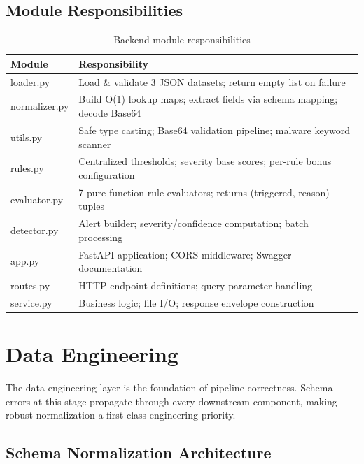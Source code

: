 \documentclass[12pt,a4paper]{article}
\begin{document}
\subsection{Module Responsibilities}

\begin{table}[H]
\centering
\begin{tabularx}{\linewidth}{>{\ttfamily}l X}
\toprule
Module & Responsibility \\
\midrule
loader.py & Load \& validate 3 JSON datasets; return empty list on failure \\
normalizer.py & Build O(1) lookup maps; extract fields via schema mapping; decode Base64 \\
utils.py & Safe type casting; Base64 validation pipeline; malware keyword scanner \\
rules.py & Centralized thresholds; severity base scores; per-rule bonus configuration \\
evaluator.py & 7 pure-function rule evaluators; returns (triggered, reason) tuples \\
detector.py & Alert builder; severity/confidence computation; batch processing \\
app.py & FastAPI application; CORS middleware; Swagger documentation \\
routes.py & HTTP endpoint definitions; query parameter handling \\
service.py & Business logic; file I/O; response envelope construction \\
\bottomrule
\end{tabularx}
\caption{Backend module responsibilities}
\end{table}

\section{Data Engineering}

The data engineering layer is the foundation of pipeline correctness. Schema errors at this stage propagate through every downstream component, making robust normalization a first-class engineering priority.

\subsection{Schema Normalization Architecture}
\end{document}
